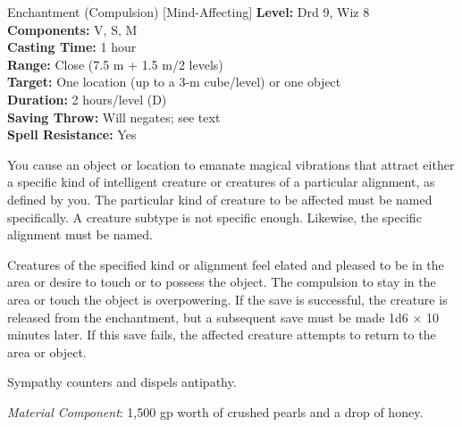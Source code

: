 {Enchantment (Compulsion) [Mind-Affecting]}
{
	\textbf{Level:}
	Drd 9, Wiz 8\\
	\textbf{Components:}
	V, S, M\\
	\textbf{Casting Time:}
	1 hour\\
	\textbf{Range:}
	Close (7.5 m + 1.5 m/2 levels)\\
	\textbf{Target:}
	One location (up to a 3-m cube/level) or one object\\
	\textbf{Duration:}
	2 hours/level (D)\\
	\textbf{Saving Throw:}
	Will negates; see text\\
	\textbf{Spell Resistance:}
	Yes\\
}
{
	You cause an object or location to emanate magical vibrations that attract either a specific kind of intelligent creature or creatures of a particular alignment, as defined by you. The particular kind of creature to be affected must be named specifically. A creature subtype is not specific enough. Likewise, the specific alignment must be named.

	Creatures of the specified kind or alignment feel elated and pleased to be in the area or desire to touch or to possess the object. The compulsion to stay in the area or touch the object is overpowering. If the save is successful, the creature is released from the enchantment, but a subsequent save must be made 1d6 $\times$ 10 minutes later. If this save fails, the affected creature attempts to return to the area or object.

	Sympathy counters and dispels antipathy.

	\textit{Material Component}:
	1,500 gp worth of crushed pearls and a drop of honey.

}
